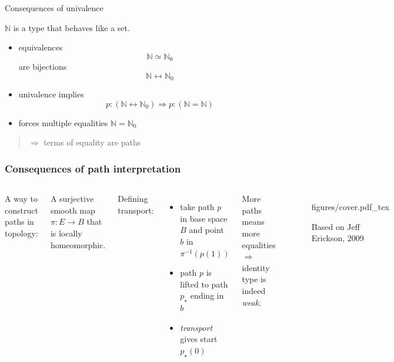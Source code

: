 \documentclass[english]{beamer}
\newcommand{\incfig}[1]{%
    \def\svgwidth{\columnwidth}
    {#1.pdf_tex}
}
\newcommand{\fig}[2]{
    \begin{figure}\begin{center}\texttt{[image: figures/\#1]}\caption{#2\label{#1}}\end{center}
    \end{figure}}
\newcommand{\tcol}[2]{
    \begin{columns}
        \column{.5\textwidth}
        #1
        \column{.5\textwidth}
        #2
    \end{columns}
}
\begin{document}
\begin{frame}{Consequences of univalence}

\begin{example}
$\mathbb{N}$ is a type that behaves like a set.
\begin{itemize}
    \item equivalences \[\mathbb{N} \simeq \mathbb{N}_0 \] are bijections \[\mathbb{N} \leftrightarrow \mathbb{N}_0 \]
    \item univalence implies \[ p : (\mathbb{N} \leftrightarrow \mathbb{N}_0 ) \Rightarrow p : (\mathbb{N} = \mathbb{N})\]

    \item forces multiple equalities $\mathbb{N} = \mathbb{N}_0$
\end{itemize}
\end{example}

\pause

\begin{quotation}
$\Rightarrow$ terms of equality are paths
\end{quotation}




\end{frame}



\begin{frame}[fragile]
    \frametitle{Consequences of path interpretation}
     
     
     
     
     \tcol{
        A way to construct paths in topology:
        \begin{definition}[Covering]
         A surjective smooth map $\pi : E \rightarrow B$ that is locally homeomorphic.
        \end{definition}

        
        Defining transport:
        \begin{itemize}
            \item take path $p$ in base space $B$ and point $b$ in $\pi^{-1}(p(1))$
            \item path $p$ is lifted to path $p_\star$ ending in $b$
            \item \emph{transport} gives start $p_\star(0)$
        \end{itemize}
        
        More paths means more equalities
        $\Rightarrow$ identity type is indeed \emph{weak}.
        
     }
     {
        \begin{figure}
        \incfig{figures/cover}
        \caption{Based on Jeff Erickson, 2009}
        \end{figure}
     }     
\end{frame}
    
\end{document}
